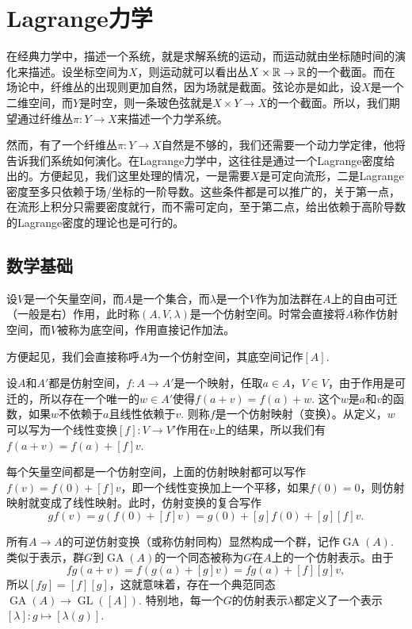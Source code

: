 \chapter{Lagrange力学}

在经典力学中，描述一个系统，就是求解系统的运动，而运动就由坐标随时间的演化来描述。设坐标空间为$X$，则运动就可以看出丛$X\times \mathbb{R}\to \mathbb{R}$的一个截面。而在场论中，纤维丛的出现则更加自然，因为场就是截面。弦论亦是如此，设$X$是一个二维空间，而$Y$是时空，则一条玻色弦就是$X\times Y\to X$的一个截面。所以，我们期望通过纤维丛$\pi:Y\to X$来描述一个力学系统。

然而，有了一个纤维丛$\pi:Y\to X$自然是不够的，我们还需要一个动力学定律，他将告诉我们系统如何演化。在Lagrange力学中，这往往是通过一个Lagrange密度给出的。方便起见，我们这里处理的情况，一是需要$X$是可定向流形，二是Lagrange密度至多只依赖于场/坐标的一阶导数。这些条件都是可以推广的，关于第一点，在流形上积分只需要密度就行，而不需可定向，至于第二点，给出依赖于高阶导数的Lagrange密度的理论也是可行的。

\section{数学基础}

\begin{para}[仿射空间]
    设$V$是一个矢量空间，而$A$是一个集合，而$\lambda$是一个$V$作为加法群在$A$上的自由可迁（一般是右）作用，此时称$(A,V,\lambda)$是一个仿射空间。时常会直接将$A$称作仿射空间，而$V$被称为底空间，作用直接记作加法。
\end{para}

方便起见，我们会直接称呼$A$为一个仿射空间，其底空间记作$[A]$. 

\begin{para}[仿射映射]
    设$A$和$A'$都是仿射空间，$f:A\to A'$是一个映射，任取$a\in A$，$V\in V$，由于作用是可迁的，所以存在一个唯一的$w\in A'$使得$f(a+v)=f(a)+w$. 这个$w$是$a$和$v$的函数，如果$w$不依赖于$a$且线性依赖于$v$. 则称$f$是一个仿射映射（变换）。从定义，$w$可以写为一个线性变换$[f]:V\to V'$作用在$v$上的结果，所以我们有$f(a+v)=f(a)+[f]v$.
\end{para}

每个矢量空间都是一个仿射空间，上面的仿射映射都可以写作$f(v)=f(0)+[f]v$，即一个线性变换加上一个平移，如果$f(0)=0$，则仿射映射就变成了线性映射。此时，仿射变换的复合写作
\[
    gf(v)=g(f(0)+[f]v)=g(0)+[g]f(0)+[g][f]v.
\]

\begin{para}[仿射表示]
    所有$A\to A$的可逆仿射变换（或称仿射同构）显然构成一个群，记作$\operatorname{GA}(A)$. 类似于表示，群$G$到$\operatorname{GA}(A)$的一个同态被称为$G$在$A$上的一个仿射表示。由于
    \[
        fg(a+v)=f(g(a)+[g]v)=fg(a)+[f][g]v,
    \]
    所以$[fg]=[f][g]$，这就意味着，存在一个典范同态$\operatorname{GA}(A)\to \operatorname{GL}([A])$. 特别地，每一个$G$的仿射表示$\lambda$都定义了一个表示$[\lambda]:g\mapsto [\lambda(g)]$.
\end{para}



